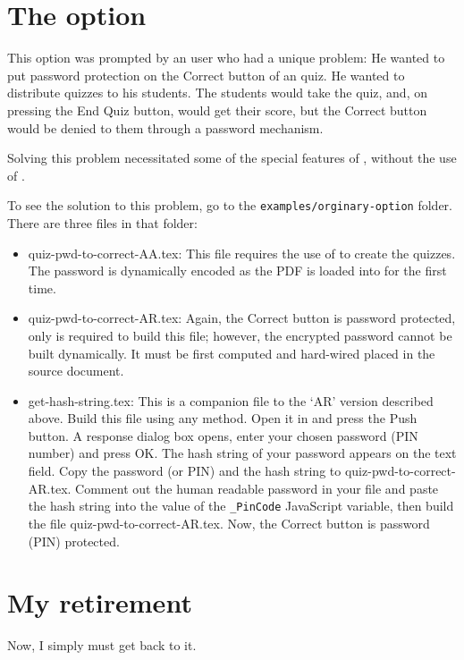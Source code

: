\documentclass{article}
\let\tops\texorpdfstring
\let\uif\textsf
\begin{document}
\section{The \tops{\protect{}}{ordinary} option}\label{ordinary}

This option was prompted by an  user who had a unique problem:
He wanted to put password protection on the \uif{Correct} button of an
 quiz. He wanted to distribute quizzes to his students. The
students would take the quiz, and, on pressing the \uif{End Quiz} button,
would get their score, but the \uif{Correct} button would be denied to them
through a password mechanism.

Solving this problem necessitated some of the special features of
, without the use of .

To see the solution to this problem, go to the
\texttt{examples/orginary-option} folder. There are three files in that
folder:
\begin{itemize}
    \item {\ttfamily quiz-pwd-to-correct-AA.tex}: This file requires the use
        of  to create the quizzes. The password is dynamically
        encoded as the PDF is loaded into  for the first time.
    \item {\ttfamily quiz-pwd-to-correct-AR.tex}: Again, the \uif{Correct}
        button is password protected, only  is required
        to build this file; however, the encrypted password cannot be built
        dynamically. It must be first computed and hard-wired placed in the
        source document.
    \item {\ttfamily get-hash-string.tex}: This is a companion file to the
        `AR' version described above. Build this file using any method.
        Open it in  and press the \uif{Push} button. A
        response dialog box opens, enter your chosen password (PIN number)
        and press \uif{OK}. The hash string of your password appears on the
        text field. Copy the password (or PIN) and the hash string to
        {\ttfamily quiz-pwd-to-correct\allowbreak-AR.tex}. Comment out the human readable
        password in your file and paste the hash string into the value of
        the \texttt{\_PinCode} JavaScript variable, then build the file
        {\ttfamily quiz-pwd-to\allowbreak-correct-AR.tex}. Now, the \uif{Correct}
        button is password (PIN) protected.

\end{itemize}

\section{My retirement}

Now, I simply must get back to it. \dps
\end{document}
